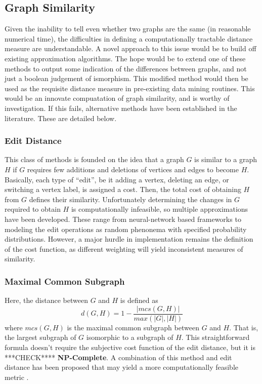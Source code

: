 \documentclass[11pt]{article}
\begin{document}
\subsection{Graph Similarity}
Given the inability to tell even whether two graphs are the same (in reasonable numerical time), the difficulties in defining a computationally tractable distance measure are understandable. A novel approach to this issue would be to build off existing approximation algorithms. The hope would be to extend one of these methods to output some indication of the differences between graphs, and not just a boolean judgement of ismorphism. This modified method would then be used as the requisite distance measure in pre-existing data mining routines. This would be an innovate compuatation of graph similarity, and is worthy of investigation. If this fails, alternative methods have been established in the literature. These are detailed below.
\subsubsection{Edit Distance}
This class of methods is founded on the idea that a graph $G$ is similar to a graph $H$ if $G$ requires few additions and deletions of vertices and edges to become $H$. Basically, each type of ``edit'', be it adding a vertex, deleting an edge, or switching a vertex label, is assigned a cost. Then, the total cost of obtaining $H$ from $G$ defines their similarity. Unfortunately determining the changes in $G$ required to obtain $H$ is computationally infeasible, so multiple approximations have been developed. These range from neural-network based frameworks to modeling the edit operations as random phenonema with specified probability distributions. However, a major hurdle in implementation remains the definition of the cost function, as different weighting will yield inconsistent measures of similarity.
\subsubsection{Maximal Common Subgraph}
Here, the distance between $G$ and $H$ is defined as
\[
d(G,H) = 1 - \frac{|mcs(G, H)|}{max(|G|,|H|)}
\]
where $mcs(G,H)$ is the maximal common subgraph between $G$ and $H$. That is, the largest subgraph of $G$ isomorphic to a subgraph of $H$. This straightforward formula doesn't require the subjective cost function of the edit distance, but it is ***CHECK**** \textbf{NP-Complete}. A combination of this method and edit distance has been proposed that may yield a more computationally feasible metric \cite{LookInSurveyPaper}.
\end{document}
